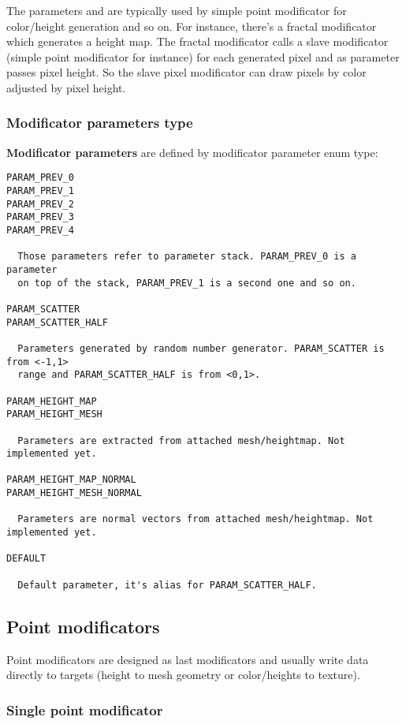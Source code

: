 \documentclass[9pt]{article}
\begin{document}
The parameters and are typically used by simple point modificator 
for color/height generation and so on. For instance, there's a fractal
modificator which generates a height map. The fractal modificator calls
a slave modificator (simple point modificator for instance) for each generated 
pixel and as parameter passes pixel height. So the slave pixel modificator can 
draw pixels by color adjusted by pixel height.

\subsubsection{Modificator parameters type}

{\bf Modificator parameters} are defined by modificator parameter enum type:
\begin{verbatim}
PARAM_PREV_0
PARAM_PREV_1
PARAM_PREV_2
PARAM_PREV_3
PARAM_PREV_4

  Those parameters refer to parameter stack. PARAM_PREV_0 is a parameter
  on top of the stack, PARAM_PREV_1 is a second one and so on.

PARAM_SCATTER
PARAM_SCATTER_HALF

  Parameters generated by random number generator. PARAM_SCATTER is from <-1,1>
  range and PARAM_SCATTER_HALF is from <0,1>.
  
PARAM_HEIGHT_MAP
PARAM_HEIGHT_MESH

  Parameters are extracted from attached mesh/heightmap. Not implemented yet.
  
PARAM_HEIGHT_MAP_NORMAL
PARAM_HEIGHT_MESH_NORMAL

  Parameters are normal vectors from attached mesh/heightmap. Not implemented yet.

DEFAULT

  Default parameter, it's alias for PARAM_SCATTER_HALF.  
\end{verbatim}

\subsection{Point modificators}

Point modificators are designed as last modificators and usually write
data directly to targets (height to mesh geometry or color/heights to texture). 

\subsubsection{Single point modificator}
\end{document}
